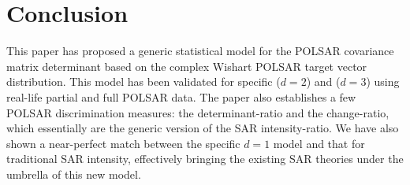 \documentclass[]{tRSL2e}
\begin{document}
%

\section{Conclusion}
\label{sec:conclusion}

This paper has proposed a generic statistical model  for the POLSAR covariance matrix determinant based on the complex Wishart POLSAR target vector distribution.%
This model has been validated for specific ($d=2$) and ($d=3$) using real-life partial and full POLSAR data.
The paper also establishes a few POLSAR discrimination measures: the determinant-ratio and the change-ratio,  which essentially are the generic version of the SAR intensity-ratio.
We have also shown a near-perfect match between the specific $d=1$ model and that for traditional SAR intensity,
  effectively bringing the existing SAR theories under the umbrella of this new model.
\end{document}
